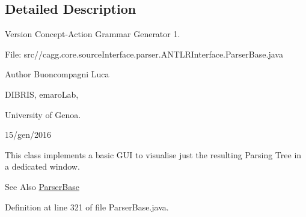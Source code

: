 \subsection{Detailed Description}
\begin{DoxyVersion}{Version}
Concept-\/\-Action Grammar Generator 1. \par
 File\-: src//cagg.core.\-source\-Interface.\-parser.\-A\-N\-T\-L\-R\-Interface.\-Parser\-Base.\-java \par

\end{DoxyVersion}
\begin{DoxyAuthor}{Author}
Buoncompagni Luca \par
 D\-I\-B\-R\-I\-S, emaro\-Lab,\par
 University of Genoa. \par
 15/gen/2016 \par

\end{DoxyAuthor}


This class implements a basic G\-U\-I to visualise just the resulting Parsing Tree in a dedicated window. 

\begin{DoxySeeAlso}{See Also}
\hyperlink{classit_1_1emarolab_1_1cagg_1_1core_1_1language_1_1parser_1_1ANTLRInterface_1_1ParserBase_3_01GL50c14717389f32c0d6ed45a3d8ee0386_a91f9d2dfcfff5c855c23100d93dd599d}{Parser\-Base} 
\end{DoxySeeAlso}


Definition at line 321 of file Parser\-Base.\-java.



